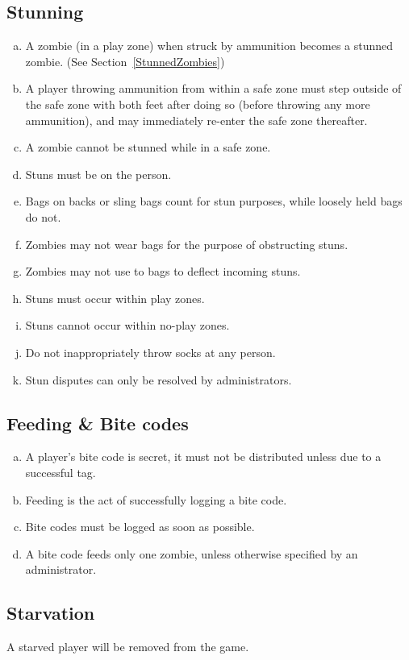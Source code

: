 \documentclass[a4paper,12pt]{article}
\begin{document}
\subsection{Stunning}

\begin{enumerate}[(a)]
    \item A zombie (in a play zone) when struck by ammunition becomes a stunned zombie. (See Section~\ref{StunnedZombies})
    \item A player throwing ammunition from within a safe zone must step outside of the safe zone with both feet after doing so (before throwing any more ammunition), and may immediately re-enter the safe zone thereafter.
    \item A zombie cannot be stunned while in a safe zone.
    \item Stuns must be on the person.
    \item Bags on backs or sling bags count for stun purposes, while loosely held bags do not. 
    \item Zombies may not wear bags for the purpose of obstructing stuns.
    \item Zombies may not use to bags to deflect incoming stuns.
    \item Stuns must occur within play zones.
    \item Stuns cannot occur within no-play zones.
    \item Do not inappropriately throw socks at any person.
    \item Stun disputes can only be resolved by administrators.
\end{enumerate}

\subsection{Feeding \& Bite codes}

\begin{enumerate}[(a)]
    \item A player's bite code is secret, it must not be distributed unless due to a successful tag.
    \item Feeding is the act of successfully logging a bite code.
    \item Bite codes must be logged as soon as possible.
    \item A bite code feeds only one zombie, unless otherwise specified by an administrator.
\end{enumerate}

\subsection{Starvation}
A starved player will be removed from the game.
\end{document}

